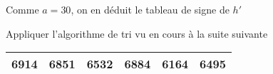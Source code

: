 \documentclass[a4paper,10pt, table]{/media/documents/Cours/Prof/Enseignements/tools/style/classDS}
\begin{document}
\begin{questions}
\begin{parts}
\begin{solution}
        
        Comme $a = 30$, on en déduit le tableau de signe de $h'$
            \begin{center}
            \end{center}

        \end{solution}
    \end{parts}

    \question
    Appliquer l'algorithme de tri vu en cours à la suite suivante
    \begin{center}
    \begin{tabular}{|*{6}{c|}}
        \hline
        6914 & 6851 & 6532 & 6884 & 6164 & 6495 \\
        \hline
    \end{tabular}
        
    \end{center}


\end{questions}
    
\end{document}
